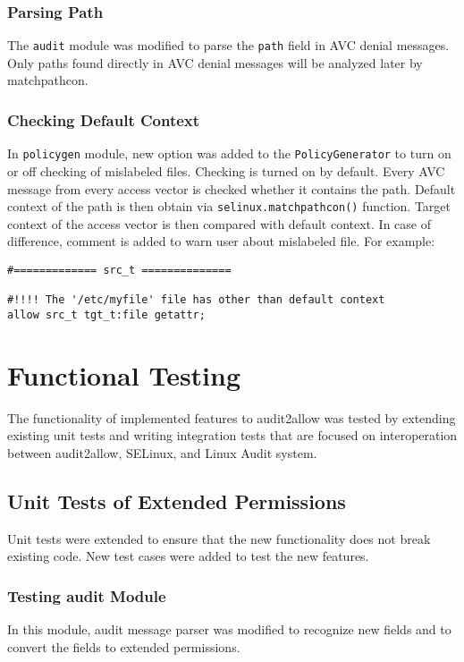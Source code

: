 \subsection{Parsing Path}
The \texttt{audit} module was modified to parse the \texttt{path} field in AVC
denial messages. Only paths found directly in AVC denial messages will be
analyzed later by matchpathcon.

\subsection{Checking Default Context}
In \texttt{policygen} module, new option was added to the
\texttt{PolicyGenerator} to turn on or off checking of mislabeled files.
Checking is turned on by default. Every AVC message from every access vector is
checked whether it contains the path. Default context of the path is then obtain
via \texttt{selinux.matchpathcon()} function. Target context of the access
vector is then compared with default context. In case of difference, comment is
added to warn user about mislabeled file. For example:
\begin{lstlisting}
#============= src_t ==============

#!!!! The '/etc/myfile' file has other than default context
allow src_t tgt_t:file getattr;
\end{lstlisting}

\chapter{Functional Testing}
The functionality of implemented features to audit2allow was tested by extending
existing unit tests and writing integration tests that are focused on
interoperation between audit2allow, SELinux, and Linux Audit system.

\section{Unit Tests of Extended Permissions}

Unit tests were extended to ensure that the new functionality does not break
existing code. New test cases were added to test the new features.

\subsection{Testing audit Module}
In this module, audit message parser was modified to recognize new fields and to
convert the fields to extended permissions.

